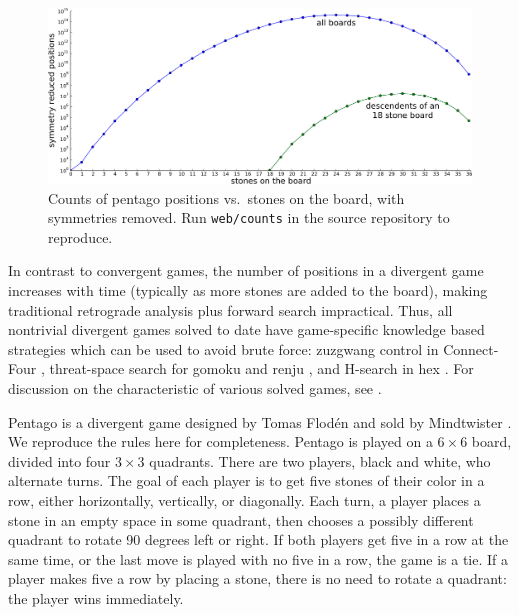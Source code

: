 \documentclass[conference]{IEEEtran}
\begin{document}
\begin{figure}
\begin{center}
\includegraphics[width=\columnwidth]{counts.pdf}
\end{center}
\vspace{-.1in}
\cprotect\caption{Counts of pentago positions vs.\ stones on the board, with symmetries removed.
Run \verb+web/counts+ in the source repository to reproduce.}
\label{counts}
\vspace{-.1in}
\end{figure}

In contrast to convergent games, the number of positions in a divergent game increases with time
(typically as more stones are added to the board), making traditional retrograde analysis plus forward
search impractical.  Thus, all nontrivial
divergent games solved to date have game-specific knowledge based strategies which can be used to avoid brute
force: zuzgwang control in Connect-Four \cite{allis1988connectfour}, threat-space search for gomoku and renju
\cite{allis1993gomoku,wagner2001renju}, and H-search in hex \cite{arneson2011hex}.  For discussion
on the characteristic of various solved games, see \cite{van2002games}.

Pentago is a divergent game designed by Tomas Flod\'en and sold by Mindtwister \cite{mindtwister2013pentago}.
We reproduce the rules here for completeness.  Pentago is played on a $6 \times 6$ board, divided into four
$3 \times 3$ quadrants. There are two players, black and white, who alternate turns. The goal of each
player is to get five stones of their color in a row, either horizontally, vertically, or diagonally.
Each turn, a player places a stone in an empty space in some quadrant, then chooses a possibly different
quadrant to rotate 90 degrees left or right. If both players get five in a row at the same time, or the
last move is played with no five in a row, the game is a tie. If a player makes five a row by placing a
stone, there is no need to rotate a quadrant: the player wins immediately.
\end{document}
